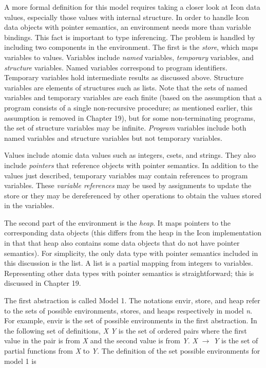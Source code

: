 A more formal definition for this model requires taking a closer look
at Icon data values, especially those values with internal
structure. In order to handle Icon data objects with pointer
semantics, an environment needs more than variable bindings. This fact
is important to type inferencing. The problem is handled by including
two components in the environment. The first is the \textit{store},
which maps variables to values. Variables include \textit{named}
variables, \textit{temporary} variables, and \textit{structure}
variables. Named variables correspond to program
identifiers. Temporary variables hold intermediate results as
discussed above. Structure variables are elements of structures such
as lists. Note that the sets of named variables and temporary
variables are each finite (based on the assumption that a program
consists of a single non-recursive procedure; as mentioned earlier,
this assumption is removed in Chapter 19), but for some
non-terminating programs, the set of structure variables may be
infinite.  \textit{Program} variables include both named variables and
structure variables but not temporary variables.

Values include atomic data values such as integers, csets, and
strings. They also include \textit{pointers} that reference objects
with pointer semantics. In addition to the values just described,
temporary variables may contain references to program variables. These
\textit{variable references} may be used by assignments to update the
store or they may be dereferenced by other operations to obtain the
values stored in the variables.

The second part of the environment is the \textit{heap}. It maps
pointers to the corresponding data objects (this differs from the heap
in the Icon implementation in that that heap also contains some data
objects that do not have pointer semantics). For simplicity, the only
data type with pointer semantics included in this discussion is the
list.  A list is a partial mapping from integers to
variables. Representing other data types with pointer semantics is
straightforward; this is discussed in Chapter 19.

The first abstraction is called Model 1. The notations
envir\TextSubscript{[}\textit{}\TextSubscript{]},
store\TextSubscript{[}\textit{}\TextSubscript{]}, and
heap\TextSubscript{[}\textit{}\TextSubscript{]} refer
to the sets of possible environments, stores, and heaps respectively
in model \textit{n}. For example, envir\TextSubscript{[1]} is the set
of possible environments in the first abstraction. In the following
set of definitions, \textit{X} {\texttimes} \textit{Y} is the set of
ordered pairs where the first value in the pair is from \textit{X} and
the second value is from \textit{Y}. \textit{X} ${\rightarrow}$
\textit{Y} is the set of partial functions from \textit{X} to
\textit{Y}. The definition of the set possible environments for model
1 is


